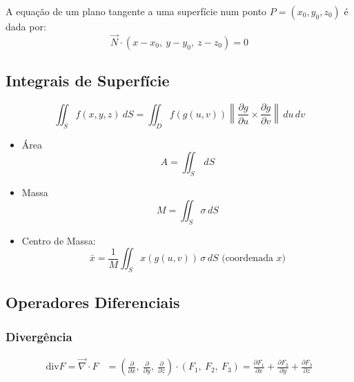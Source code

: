 \documentclass[11pt, a4paper]{article}
\begin{document}
A equação de um plano tangente a uma superfície num ponto $P = (x_0, y_0, z_0)$ é dada por:
\begin{equation*}
    \vec{N} \cdot \left(x - x_0,\ y - y_0,\ z - z_0\right) = 0
\end{equation*}

\subsection{Integrais de Superfície}

\begin{equation*}
    \iint_S f(x, y, z) \ dS = \iint_D f(g(u, v))
    \left\lVert
    \frac{\partial g}{\partial u} \times
    \frac{\partial g}{\partial v}
    \right\rVert \, du\,dv
\end{equation*}

\begin{itemize}
    \item Área
          \begin{equation*}
              A = \iint_S \, dS
          \end{equation*}
    \item Massa
          \begin{equation*}
              M = \iint_S \sigma \, dS
          \end{equation*}
    \item Centro de Massa:
          \begin{equation*}
              \bar{x} = \frac{1}{M} \iint_S x(g(u, v)) \, \sigma \, dS
              \text{ \ \ \ \ \  (coordenada $x$)}
          \end{equation*}
\end{itemize}

\subsection{Operadores Diferenciais}

\subsubsection{Divergência}

\begin{align*}
    \text{div} F = \vec{\nabla} \cdot F & = \left(\frac{\partial}{\partial x}
    ,\ \frac{\partial}{\partial y}
    ,\ \frac{\partial}{\partial z}\right)
    \cdot (F_1,\ F_2,\ F_3)
    = \frac{\partial F_1}{\partial x}
    + \frac{\partial F_2}{\partial y}
    + \frac{\partial F_3}{\partial z}
\end{align*}
\end{document}
